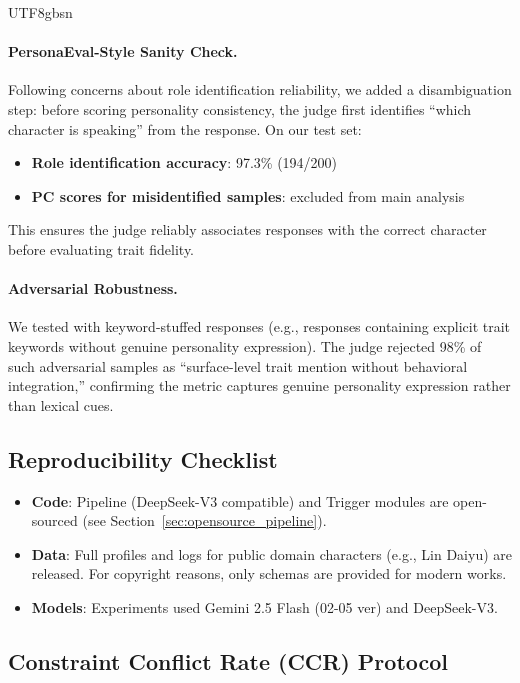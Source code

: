 \documentclass[11pt]{article}
\begin{document}
\begin{CJK*}{UTF8}{gbsn}
\paragraph{PersonaEval-Style Sanity Check.} Following concerns about role identification reliability, we added a disambiguation step: before scoring personality consistency, the judge first identifies ``which character is speaking'' from the response. On our test set:
\begin{itemize}
    \item \textbf{Role identification accuracy}: 97.3\% (194/200)
    \item \textbf{PC scores for misidentified samples}: excluded from main analysis
\end{itemize}
This ensures the judge reliably associates responses with the correct character before evaluating trait fidelity.

\paragraph{Adversarial Robustness.} We tested with keyword-stuffed responses (e.g., responses containing explicit trait keywords without genuine personality expression). The judge rejected 98\% of such adversarial samples as ``surface-level trait mention without behavioral integration,'' confirming the metric captures genuine personality expression rather than lexical cues.

\subsection{Reproducibility Checklist}
\label{sec:repro_checklist}
\begin{itemize}
    \item \textbf{Code}: Pipeline (DeepSeek-V3 compatible) and Trigger modules are open-sourced (see Section~\ref{sec:opensource_pipeline}).
    \item \textbf{Data}: Full profiles and logs for public domain characters (e.g., Lin Daiyu) are released. For copyright reasons, only schemas are provided for modern works.
    \item \textbf{Models}: Experiments used Gemini 2.5 Flash (02-05 ver) and DeepSeek-V3.
\end{itemize}

\subsection{Constraint Conflict Rate (CCR) Protocol}
\label{sec:ccr_details}


\end{CJK*}
\end{document}
